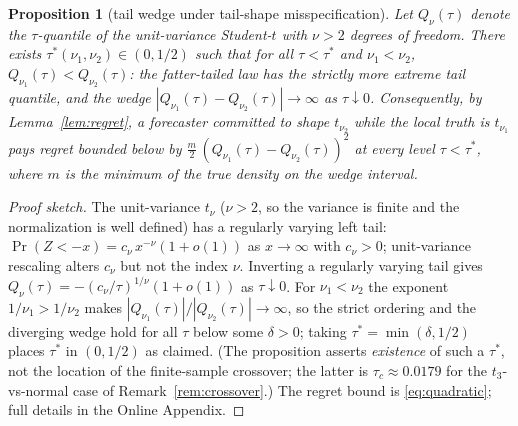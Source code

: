 \documentclass[11pt]{article}
\newtheorem{proposition}{Proposition}
\theoremstyle{remark}
\begin{document}
\begin{proposition}[tail wedge under tail-shape misspecification]
\label{prop:wedge}
Let $Q_\nu(\tau)$ denote the $\tau$-quantile of the unit-variance
Student-$t$ with $\nu > 2$ degrees of freedom. There exists
$\tau^*(\nu_1,\nu_2) \in (0, 1/2)$ such that for all
$\tau < \tau^*$ and $\nu_1 < \nu_2$,
$Q_{\nu_1}(\tau) < Q_{\nu_2}(\tau)$: the fatter-tailed law has the
strictly more extreme tail quantile, and the wedge
$|Q_{\nu_1}(\tau) - Q_{\nu_2}(\tau)| \to \infty$ as
$\tau \downarrow 0$. Consequently, by Lemma~\ref{lem:regret}, a
forecaster committed to shape $t_{\nu_2}$ while the local truth is
$t_{\nu_1}$ pays regret bounded below by
$\tfrac{m}{2}\,(Q_{\nu_1}(\tau) - Q_{\nu_2}(\tau))^2$ at every level
$\tau < \tau^*$, where $m$ is the minimum of the true density on the
wedge interval.
\end{proposition}
\begin{proof}[Proof sketch]
The unit-variance $t_\nu$ ($\nu>2$, so the variance is finite and the
normalization is well defined) has a regularly varying left tail:
$\Pr(Z < -x) = c_\nu\, x^{-\nu}(1 + o(1))$ as $x \to \infty$ with
$c_\nu > 0$; unit-variance rescaling alters $c_\nu$ but not the index
$\nu$. Inverting a regularly varying tail \citep{embrechts1997} gives
$Q_\nu(\tau) = -(c_\nu/\tau)^{1/\nu}(1+o(1))$ as $\tau \downarrow 0$.
For $\nu_1 < \nu_2$ the exponent $1/\nu_1 > 1/\nu_2$ makes
$|Q_{\nu_1}(\tau)| / |Q_{\nu_2}(\tau)| \to \infty$, so the strict
ordering and the diverging wedge hold for all $\tau$ below some
$\delta > 0$; taking $\tau^* = \min(\delta, 1/2)$ places $\tau^*$ in
$(0,1/2)$ as claimed. (The proposition asserts \emph{existence} of such
a $\tau^*$, not the location of the finite-sample crossover; the latter
is $\tau_c\approx 0.0179$ for the $t_3$-vs-normal case of
Remark~\ref{rem:crossover}.) The regret bound is \eqref{eq:quadratic};
full details in the Online Appendix.
\end{proof}
\end{document}
